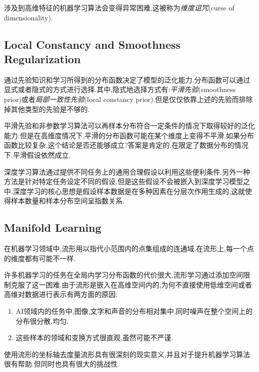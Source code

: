 涉及到高维特征的机器学习算法会变得异常困难,这被称为\textit{维度诅咒}(curse of dimensionality).

\subsection{Local Constancy and Smoothness Regularization}

通过先验知识和学习所得到的分布函数决定了模型的泛化能力.分布函数可以通过显式或者隐式的方式进行选择.其中,隐式地选择方式有:\textit{平滑先验}(smoothness prior)或者\textit{局部一致性先验}(local constancy prior).但是仅仅依靠上述的先验而排除掉其他类型的先验是不够的.

平滑先验和非参数学习算法可以再样本分布符合一定条件的情况下取得较好的泛化能力.但是在高维度情况下,平滑的分布函数可能在某个维度上变得不平滑.如果分布函数比较复杂,这个结论是否还能够成立?答案是肯定的.在限定了数据分布的情况下,平滑假设依然成立.

深度学习算法通过提供不同任务上的通用合理假设以利用这些便利条件.另外一种方法是针对特定任务设定不同的假设,但是这些假设不会被嵌入到深度学习模型之中.深度学习的核心思想是假设样本数据是在多种因素在分层次作用生成的,这就使得样本数量和样本分布空间呈指数关系.

\subsection{Manifold Learning}

在机器学习领域中,流形用以指代小范围内的点集组成的连通域.在流形上,每一个点的维度都有可能不一样.

许多机器学习的任务在全局内学习分布函数的代价很大,流形学习通过添加空间限制克服了这一困难.由于流形是嵌入在高维空间内的,为何不直接使用低维空间或者高维对数据进行表示有两方面的原因:
\begin{enumerate}
\item AI领域内的任务中,图像,文字和声音的分布相对集中,同时噪声在整个空间上的分布很分散,均匀.
\item 这些样本的领域和变换方式很直观,虽然可能不严谨.
\end{enumerate}

使用流形的坐标轴去度量流形具有很深刻的现实意义,并且对于提升机器学习算法很有帮助.但同时也具有很大的挑战性.